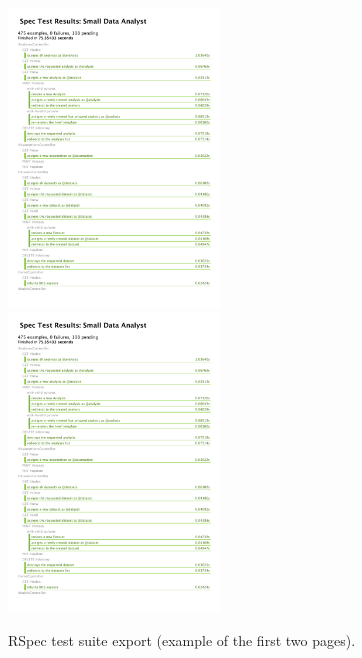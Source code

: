 \begin{figure}
	\includegraphics[page=1,width=0.5\textwidth]{appendix/RSpec}
	\includegraphics[page=2,width=0.5\textwidth]{appendix/RSpec}
	\caption{RSpec test suite export (example of the first two pages).}
	\label{sub:test_suit}
\end{figure}




